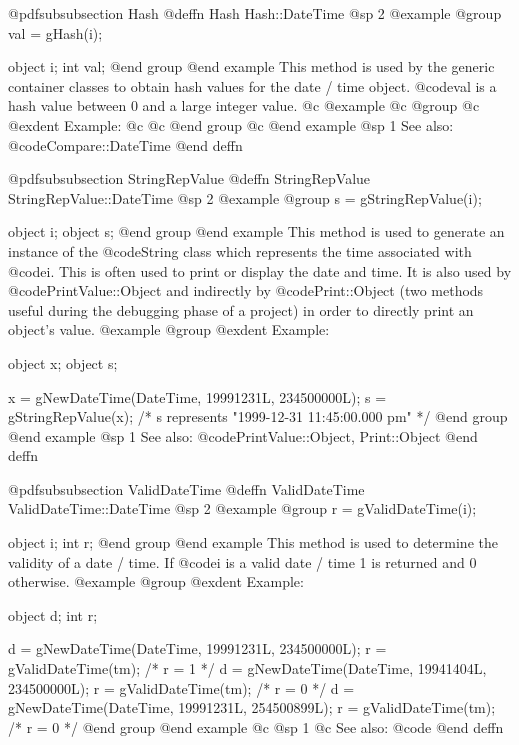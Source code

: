 @pdfsubsubsection {Hash}
@deffn {Hash} Hash::DateTime
@sp 2
@example
@group
val = gHash(i);

object  i;
int     val;
@end group
@end example
This method is used by the generic container classes to obtain hash values
for the date / time object.  @code{val} is a hash value between 0 and a large
integer value.
@c @example
@c @group
@c @exdent Example:
@c
@c @end group
@c @end example
@sp 1
See also:  @code{Compare::DateTime}
@end deffn











@pdfsubsubsection {StringRepValue}
@deffn {StringRepValue} StringRepValue::DateTime
@sp 2
@example
@group
s = gStringRepValue(i);

object  i;
object  s;
@end group
@end example
This method is used to generate an instance of the @code{String} class
which represents the time associated with @code{i}.  This is often
used to print or display the date and time.  It is also used by
@code{PrintValue::Object} and indirectly by @code{Print::Object}
(two methods useful during the debugging phase of a project)
in order to directly print an object's value.
@example
@group
@exdent Example:

object  x;
object  s;

x = gNewDateTime(DateTime, 19991231L, 234500000L);
s = gStringRepValue(x);
/*  s represents "1999-12-31 11:45:00.000 pm"   */
@end group
@end example
@sp 1
See also:  @code{PrintValue::Object, Print::Object}
@end deffn










@pdfsubsubsection {ValidDateTime}
@deffn {ValidDateTime} ValidDateTime::DateTime
@sp 2
@example
@group
r = gValidDateTime(i);

object  i;
int     r;
@end group
@end example
This method is used to determine the validity of a date / time.
If @code{i} is a valid date / time 1 is returned and 0 otherwise.
@example
@group
@exdent Example:

object  d;
int     r;

d = gNewDateTime(DateTime, 19991231L, 234500000L);
r = gValidDateTime(tm);   /*  r = 1  */
d = gNewDateTime(DateTime, 19941404L, 234500000L);
r = gValidDateTime(tm);   /*  r = 0  */
d = gNewDateTime(DateTime, 19991231L, 254500899L);
r = gValidDateTime(tm);   /*  r = 0  */
@end group
@end example
@c @sp 1
@c See also:  @code{}
@end deffn













